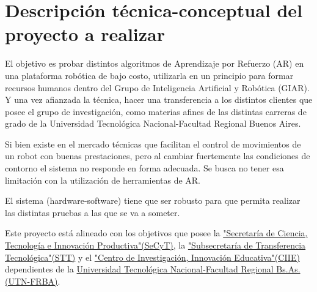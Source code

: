 \documentclass[11pt]{charter}
\begin{document}
\section{Descripción técnica-conceptual del proyecto a realizar}
\label{sec:descripcion}

El objetivo es probar distintos algoritmos de Aprendizaje por Refuerzo (AR) en una plataforma robótica de bajo costo, utilizarla en un principio para formar recursos humanos dentro del Grupo de Inteligencia Artificial y Robótica (GIAR). Y una vez afianzada la técnica, hacer una transferencia a los distintos clientes que posee el grupo de investigación, como materias afines de las distintas carreras de grado de la Universidad Tecnológica Nacional-Facultad Regional Buenos Aires.
 
Si bien existe en el mercado técnicas que facilitan el control de movimientos de un robot con buenas prestaciones, pero al cambiar fuertemente las condiciones de contorno  el sistema no responde en forma adecuada. Se busca no tener esa limitación con la utilización de herramientas de AR.

El sistema (hardware-software) tiene que ser robusto para que permita realizar las distintas pruebas a las que se va a someter.

Este proyecto está alineado con los objetivos que posee la \href{https://www.frba.utn.edu.ar/secretarias/}{"Secretaría de Ciencia, Tecnología e Innovación Productiva"(SeCyT)}, la \href{https://www.frba.utn.edu.ar/transferencia/transferencia-tecnologica/}{"Subsecretaría de Transferencia Tecnológica"(STT)} y el \href{https://www.frba.utn.edu.ar/ciie/}{"Centro de Investigación, Innovación Educativa"(CIIE)} dependientes de la \href{https://www.frba.utn.edu.ar/}{Universidad Tecnológica Nacional-Facultad Regional Bs.As.(UTN-FRBA)}.



\end{document}
